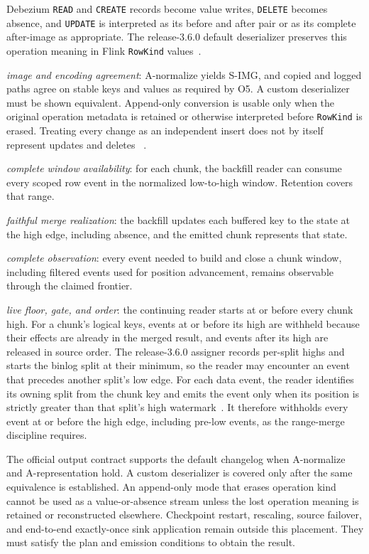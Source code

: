 \documentclass[sigconf,nonacm,10pt]{acmart}
\theoremstyle{plain}
\theoremstyle{definition}
\begin{document}
\begin{description}
Debezium \texttt{READ} and \texttt{CREATE} records become value writes,
\texttt{DELETE} becomes absence, and \texttt{UPDATE} is interpreted as
its before and after pair or as its complete after-image as appropriate.
The release-3.6.0 default deserializer preserves this operation meaning
in Flink \texttt{RowKind} values~\cite{flinkcdc_source_code}.
\item[\textbf{A-representation}] \emph{image and encoding agreement}:
A-normalize yields S-IMG, and copied and logged paths agree on stable
keys and values as required by O5. A custom deserializer must be shown
equivalent. Append-only conversion is usable only when the original
operation metadata is retained or otherwise interpreted before
\texttt{RowKind} is erased. Treating every change as an independent
insert does not by itself represent updates and deletes
~\cite{flinkcdc_source_code}.
\item[\textbf{A-window}] \emph{complete window availability}: for each
chunk, the backfill reader can consume every scoped row event in the
normalized low-to-high window. Retention covers that range.
\item[\textbf{A-merge}] \emph{faithful merge realization}: the
backfill updates each buffered key to the state at the high edge,
including absence, and the emitted chunk represents that state.
\item[\textbf{S-OBS}] \emph{complete observation}: every event needed
to build and close a chunk window, including filtered events used for
position advancement, remains observable through the claimed frontier.
\item[\textbf{A-handoff}] \emph{live floor, gate, and order}: the
continuing reader starts at or before every chunk high. For a chunk's
logical keys, events at or before its high are withheld because their
effects are already in the merged result, and events after its high
are released in source order. The release-3.6.0 assigner records
per-split highs and starts the binlog split at their minimum, so the
reader may encounter an event that precedes another split's low edge.
For each data event, the reader identifies its owning split from the
chunk key and emits the event only when its position is strictly greater
than that split's high watermark~\cite{flinkcdc_source_code}. It
therefore withholds every event at or before the high edge, including
pre-low events, as the range-merge discipline requires.
\end{description}

The official output contract supports the default changelog when
A-normalize and A-representation hold. A custom deserializer is covered
only after the same equivalence is established. An append-only mode that
erases operation kind cannot be used as a value-or-absence stream unless
the lost operation meaning is retained or reconstructed elsewhere.
Checkpoint restart, rescaling, source failover, and end-to-end
exactly-once sink application remain outside this placement. They must
satisfy the plan and emission conditions to obtain the result.
\end{document}
